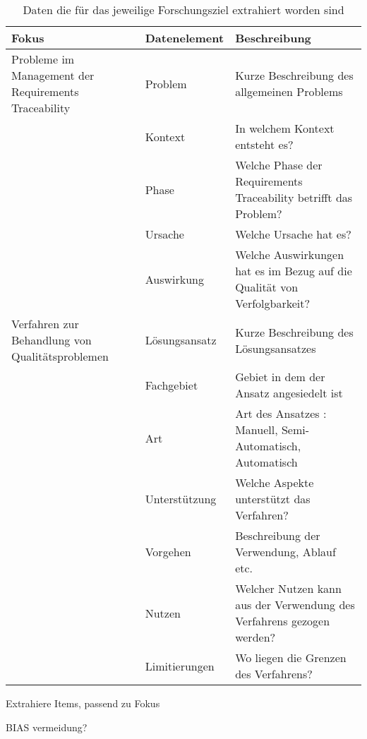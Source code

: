 \begin{table*}[t]
    \centering
    \begin{tabularx}{\textwidth}{lXX}
        \toprule
        Fokus & Datenelement & Beschreibung \\ \midrule
        Probleme im Management der Requirements Traceability            & Problem       & Kurze Beschreibung des allgemeinen Problems \\
                                                                        & Kontext       & In welchem Kontext entsteht es? \\
                                                                        & Phase         & Welche Phase der Requirements Traceability betrifft das Problem? \\
                                                                        & Ursache       & Welche Ursache hat es?  \\
                                                                        & Auswirkung    & Welche Auswirkungen hat es im Bezug auf die Qualität von Verfolgbarkeit? \\
        Verfahren zur Behandlung von Qualitätsproblemen                 & Lösungsansatz & Kurze Beschreibung des Lösungsansatzes \\
                                                                        & Fachgebiet    & Gebiet in dem der Ansatz angesiedelt ist  \\
                                                                        & Art           & Art des Ansatzes : Manuell, Semi-Automatisch, Automatisch \\
                                                                        & Unterstützung & Welche Aspekte unterstützt das Verfahren? \\
                                                                        & Vorgehen      & Beschreibung der Verwendung, Ablauf etc. \\
                                                                        & Nutzen        & Welcher Nutzen kann aus der Verwendung des Verfahrens gezogen werden? \\
                                                                        & Limitierungen & Wo liegen die Grenzen des Verfahrens? \\
    \bottomrule
    \end{tabularx}
    \caption{Daten die für das jeweilige Forschungsziel extrahiert worden sind}
    \label{tab:dataextraction_special}
\end{table*}

Extrahiere Items, passend zu Fokus

BIAS vermeidung?


